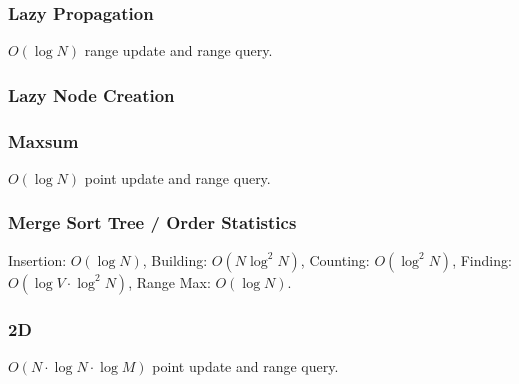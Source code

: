 \documentclass{article}
\begin{document}
\subsubsection{Lazy Propagation}
$O(\log N)$ range update and range query.


\subsubsection{Lazy Node Creation}


\subsubsection{Maxsum}
$O(\log N)$ point update and range query.


\subsubsection{Merge Sort Tree / Order Statistics}
Insertion: $O(\log N)$, Building: $O(N \log^2 N)$, Counting: $O(\log^2 N)$, Finding: $O(\log V \cdot \log^2 N)$, Range Max: $O(\log N)$.


\subsubsection{2D}
$O(N \cdot \log N \cdot \log M)$ point update and range query.

\end{document}
